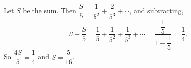 Let $S$ be the sum. Then $\dfrac {S}{5}=\dfrac{1}{5^2}+\dfrac{2}{5^3}+\cdots$, and subtracting,
\[S-\dfrac {S}{5}=\dfrac{1}{5}+\dfrac{1}{5^2}+\dfrac{1}{5^3}+\cdots=\dfrac{\dfrac{1}{5}}{1-\dfrac{1}{5}}=\dfrac{1}{4}.\]
So $\dfrac{4S}{5}=\dfrac{1}{4}$ and $S=\boxed{\dfrac{5}{16}}$.
